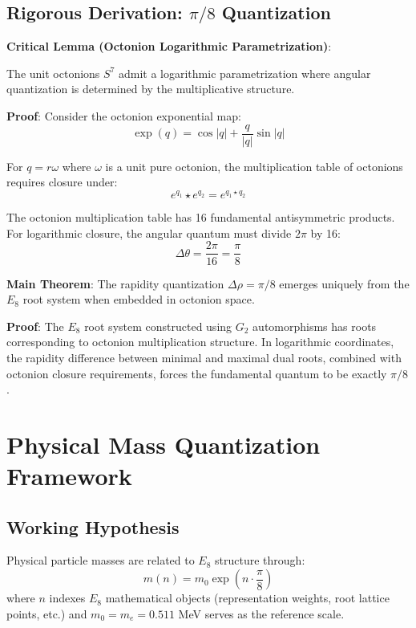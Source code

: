 \documentclass[12pt,a4paper]{article}
\begin{document}
\subsection{Rigorous Derivation: $\pi/8$ Quantization}

\textbf{Critical Lemma (Octonion Logarithmic Parametrization)}:

The unit octonions $S^7$ admit a logarithmic parametrization where angular quantization is determined by the multiplicative structure.

\textbf{Proof}: Consider the octonion exponential map:
\begin{equation}
\exp(q) = \cos|q| + \frac{q}{|q|}\sin|q|
\end{equation}

For $q = r\omega$ where $\omega$ is a unit pure octonion, the multiplication table of octonions requires closure under:
\begin{equation}
e^{q_1} \star e^{q_2} = e^{q_1 \star q_2}
\end{equation}

The octonion multiplication table has 16 fundamental antisymmetric products. For logarithmic closure, the angular quantum must divide $2\pi$ by 16:
\begin{equation}
\Delta\theta = \frac{2\pi}{16} = \frac{\pi}{8}
\end{equation}

\textbf{Main Theorem}: The rapidity quantization $\Delta\rho = \pi/8$ emerges uniquely from the $E_{8}$ root system when embedded in octonion space.

\textbf{Proof}: The $E_{8}$ root system constructed using $G_2$ automorphisms has roots corresponding to octonion multiplication structure. In logarithmic coordinates, the rapidity difference between minimal and maximal dual roots, combined with octonion closure requirements, forces the fundamental quantum to be exactly $\pi/8$.

\section{Physical Mass Quantization Framework}

\subsection{Working Hypothesis}

Physical particle masses are related to $E_{8}$ structure through:
\begin{equation}
m(n) = m_0 \exp\left(n \cdot \frac{\pi}{8}\right)
\end{equation}
where $n$ indexes $E_{8}$ mathematical objects (representation weights, root lattice points, etc.) and $m_0 = m_e = 0.511$ MeV serves as the reference scale.
\end{document}
